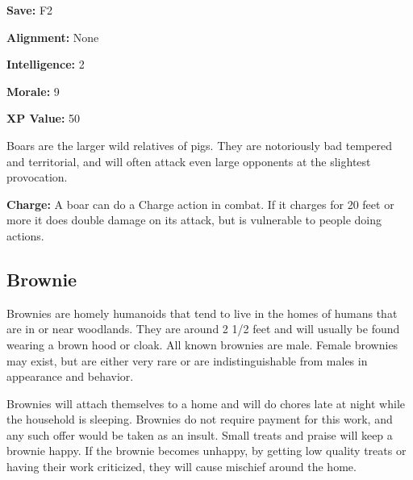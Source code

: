 \begin{multicols*}{2}
{\textbf{Save:} F2

\textbf{Alignment:} None

\textbf{Intelligence:} 2

\textbf{Morale:} 9

\textbf{XP Value:} 50}

Boars are the larger wild relatives of pigs. They are notoriously bad tempered and territorial, and will often attack even large opponents at the slightest provocation.

\textbf{Charge:} A boar can do a Charge action in combat. If it charges for 20 feet or more it does double damage on its attack, but is vulnerable to people doing  actions.

\subsection{Brownie}

Brownies are homely humanoids that tend to live in the homes of humans that are in or near woodlands. They are around 2 1/2 feet and will usually be found wearing a brown hood or cloak. All known brownies are male. Female brownies may exist, but are either very rare or are indistinguishable from males in appearance and behavior.

Brownies will attach themselves to a home and will do chores late at night while the household is sleeping. Brownies do not require payment for this work, and any such offer would be taken as an insult. Small treats and praise will keep a brownie happy. If the brownie becomes unhappy, by getting low quality treats or having their work criticized, they will cause mischief around the home.


\end{multicols*}
